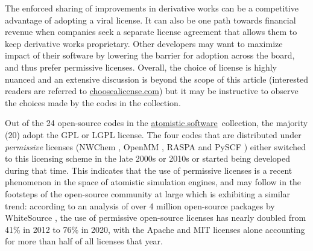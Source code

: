 \documentclass[9pt,review,ASAPversion]{livecoms}
\newcommand{\atsoft}{\href{https://atomistic.software}{atomistic.software}\ }
\begin{document}
The enforced sharing of improvements in derivative works can be a competitive advantage of adopting a viral license. 
It can also be one path towards financial revenue when companies seek a separate license agreement that allows them to keep derivative works proprietary.
Other developers may want to maximize impact of their software by lowering the barrier for adoption across the board, and thus prefer permissive licenses.
Overall, the choice of license is highly nuanced and an extensive discussion is beyond the scope of this article (interested readers are referred to \url{choosealicense.com}) but it may be instructive to observe the choices made by the codes in the collection.

Out of the 24 open-source codes in the \atsoft collection, the majority (20) adopt the GPL or LGPL license.
The four codes that are distributed under \emph{permissive} licenses (NWChem \cite{Apra2020}, OpenMM \cite{Eastman2017}, RASPA \cite{Dubbeldam2016a} and PySCF \cite{Sun2020a}) either switched to this licensing scheme in the late 2000s or 2010s or started being developed during that time.
This indicates that the use of permissive licenses is a recent phenomenon in the space of atomistic simulation engines, and may follow in the footsteps of the open-source community at large which is exhibiting a similar trend:
according to an analysis of over 4 million open-source packages by WhiteSource \cite{WhiteSource2021}, the use of permissive open-source licenses has nearly doubled from 41\% in 2012 to 76\% in 2020, with the Apache and MIT licenses alone accounting for more than half of all licenses that year.




\end{document}
